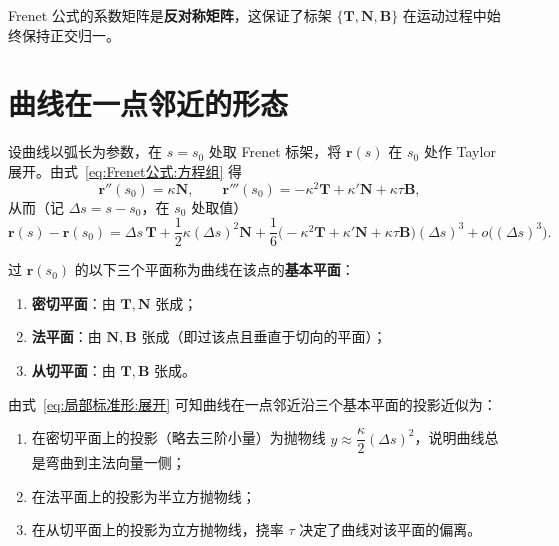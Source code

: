 \begin{remark}
	Frenet 公式的系数矩阵是\textbf{反对称矩阵}，这保证了标架 $\{\mathbf{T},\mathbf{N},\mathbf{B}\}$ 在运动过程中始终保持正交归一。
\end{remark}

\section{曲线在一点邻近的形态}

设曲线以弧长为参数，在 $s=s_0$ 处取 Frenet 标架，将 $\boldsymbol{r}(s)$ 在 $s_0$ 处作 Taylor 展开。由式~\eqref{eq:Frenet公式:方程组} 得
\begin{equation}
	\boldsymbol{r}''(s_0)=\kappa\mathbf{N},\qquad
	\boldsymbol{r}'''(s_0)=-\kappa^{2}\mathbf{T}+\kappa'\mathbf{N}+\kappa\tau\mathbf{B},
	\label{eq:局部标准形:导数}
\end{equation}
从而（记 $\Delta s=s-s_0$，在 $s_0$ 处取值）
\begin{equation}
	\boldsymbol{r}(s)-\boldsymbol{r}(s_0)
	=\Delta s\,\mathbf{T}
	+\frac{1}{2}\kappa(\Delta s)^{2}\mathbf{N}
	+\frac{1}{6}\bigl(-\kappa^{2}\mathbf{T}+\kappa'\mathbf{N}+\kappa\tau\mathbf{B}\bigr)(\Delta s)^{3}+o\bigl((\Delta s)^{3}\bigr).
	\label{eq:局部标准形:展开}
\end{equation}

\begin{definition}
	过 $\boldsymbol{r}(s_0)$ 的以下三个平面称为曲线在该点的\textbf{基本平面}：
	\begin{enumerate}
		\item \textbf{密切平面}：由 $\mathbf{T},\mathbf{N}$ 张成；
		\item \textbf{法平面}：由 $\mathbf{N},\mathbf{B}$ 张成（即过该点且垂直于切向的平面）；
		\item \textbf{从切平面}：由 $\mathbf{T},\mathbf{B}$ 张成。
	\end{enumerate}
\end{definition}

由式~\eqref{eq:局部标准形:展开} 可知曲线在一点邻近沿三个基本平面的投影近似为：
\begin{enumerate}
	\item 在密切平面上的投影（略去三阶小量）为抛物线 $y\approx\dfrac{\kappa}{2}(\Delta s)^{2}$，说明曲线总是弯曲到主法向量一侧；
	\item 在法平面上的投影为半立方抛物线；
	\item 在从切平面上的投影为立方抛物线，挠率 $\tau$ 决定了曲线对该平面的偏离。
\end{enumerate}

